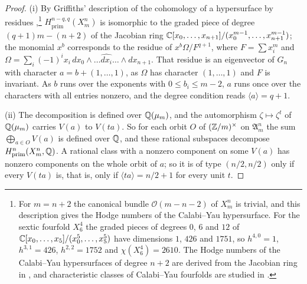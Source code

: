 \begin{proof}
(i) By Griffiths' description of the cohomology of a hypersurface by
residues \cite[\S8]{Gri69},\footnote{For $m=n+2$ the canonical bundle
$\mathcal O(m-n-2)$ of $X^{n}_{m}$ is trivial, and this description gives the
Hodge numbers of the Calabi--Yau hypersurface. For the sextic fourfold
$X^{4}_{6}$ the graded pieces of degrees $0$, $6$ and $12$ of
$\mathbb{C}[x_{0},\dots,x_{5}]/(x_{0}^{5},\dots,x_{5}^{5})$ have dimensions $1$,
$426$ and $1751$, so $h^{4,0}=1$, $h^{3,1}=426$, $h^{2,2}=1752$ and
$\chi(X^{4}_{6})=2610$. The Hodge numbers of the Calabi--Yau hypersurfaces
of degree $n+2$ are derived from the Jacobian ring in \cite{BhaCY26}, and
characteristic classes of Calabi--Yau fourfolds are studied in
\cite{BSBSNT26}.} $H^{n-q,q}_{\mathrm{prim}}(X^{n}_{m})$ is
isomorphic to the graded piece of degree $(q+1)m-(n+2)$ of the Jacobian ring
$\mathbb{C}[x_{0},\dots,x_{n+1}]/(x_{0}^{m-1},\dots,x_{n+1}^{m-1})$; the monomial
$x^{b}$ corresponds to the residue of $x^{b}\Omega/F^{q+1}$, where
$F=\sum x_{i}^{m}$ and $\Omega=\sum_{i}(-1)^{i}x_{i}\,dx_{0}\wedge\dots
\widehat{dx_{i}}\dots\wedge dx_{n+1}$. That residue is an eigenvector of
$G_{n}$ with character $a=b+(1,\dots,1)$, as $\Omega$ has character
$(1,\dots,1)$ and $F$ is invariant. As $b$ runs over the exponents with
$0\le b_{i}\le m-2$, $a$ runs once over the characters with all entries
nonzero, and the degree condition reads $\langle a\rangle=q+1$.

(ii) The decomposition is defined over $\mathbb{Q}(\mu_{m})$, and the automorphism
$\zeta\mapsto\zeta^{t}$ of $\mathbb{Q}(\mu_{m})$ carries $V(a)$ to $V(ta)$. So for
each orbit $O$ of $(\mathbb{Z}/m)^{\times}$ on $\mathfrak A^{n}_{m}$ the sum
$\bigoplus_{a\in O}V(a)$ is defined over $\mathbb{Q}$, and these rational subspaces
decompose $H^{n}_{\mathrm{prim}}(X^{n}_{m},\mathbb{Q})$. A rational class with a
nonzero component on some $V(a)$ has nonzero components on the whole orbit of
$a$; so it is of type $(n/2,n/2)$ only if every $V(ta)$ is, that is, only if
$\langle ta\rangle=n/2+1$ for every unit $t$.
\end{proof}

